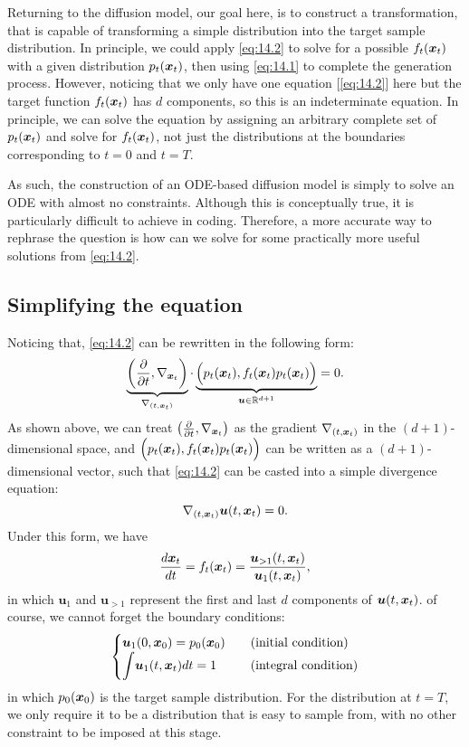Returning to the diffusion model, our goal here, is to construct a transformation, that is capable of transforming a simple distribution into the target sample distribution. In principle, we could apply \cref{eq:14.2} to solve for a possible $f_t(\bm{x}_{t})$ with a given distribution $p_t(\bm{x}_{t})$, then using \cref{eq:14.1} to complete the generation process. However, noticing that we only have one equation [\cref{eq:14.2}] here but the target function $f_t(\bm{x}_{t})$ has $d$ components, so this is an indeterminate equation. In principle, we can solve the equation by assigning an arbitrary complete set of $p_{t}(\bm{x}_t)$ and solve for $f_t(\bm{x}_{t})$, not just the distributions at the boundaries corresponding to $t=0$ and $t=T$.

As such, the construction of an ODE-based diffusion model is simply to solve an ODE with almost no constraints. Although this is conceptually true, it is particularly difficult to achieve in coding. Therefore, a more accurate way to rephrase the question is how can we solve for some practically more useful solutions from \cref{eq:14.2}.

\subsection{Simplifying the equation}

Noticing that, \cref{eq:14.2} can be rewritten in the following form:
\begin{equation}
    \label{eq:14.3}
    \underbrace{\left(\frac{\partial}{\partial t},\nabla_{\bm{x}_{t}}\right)}_{\nabla_{(t,\bm{x}_{t})}}\cdot \underbrace{\Bigl(p_t(\bm{x}_{t}),f_t(\bm{x}_{t})p_t(\bm{x}_{t}) \Bigr)}_{\bm{u}\in\mathbb{R}^{d+1}}=0.
\end{equation}
As shown above, we can treat $\left(\frac{\partial}{\partial t},\nabla_{\bm{x}_{t}}\right)$ as the gradient $\nabla_{(t,\bm{x}_{t})}$ in the $(d+1)$-dimensional space, and $\Bigl(p_t(\bm{x}_{t}),f_t(\bm{x}_{t})p_t(\bm{x}_{t}) \Bigr)$ can be written as a $(d+1)$-dimensional vector, such that \cref{eq:14.2} can be casted into a simple divergence equation:
\begin{equation}
    \label{eq:14.4}
    \nabla_{(t,\bm{x}_{t})}\bm{u}(t,\bm{x}_{t})=0.
\end{equation}
Under this form, we have 
\begin{equation}
    \label{eq:14.5}
    \frac{d\bm{x}_{t}}{dt}=f_t(\bm{x}_{t})=\frac{\bm{u}_{>1}(t,\bm{x}_{t})}{\bm{u}_1(t,\bm{x}_{t})},
\end{equation}
in which $\bm{u}_1$ and $\bm{u}_{>1}$ represent the first and last $d$ components of $\bm{u}(t,\bm{x}_{t})$. of course, we cannot forget the boundary conditions:
\begin{equation}
\label{eq:14.6}
    \begin{cases}
    \bm{u}_1(0,\bm{x}_0)=p_0(\bm{x}_0)  &\quad \mbox{(initial condition)} \\
    \displaystyle{\int}\bm{u}_1(t,\bm{x}_{t})dt=1 &\quad \mbox{(integral condition)} 
    \end{cases}
\end{equation}
in which $p_0(\bm{x}_0)$ is the target sample distribution. For the distribution at $t=T$, we only require it to be a distribution that is easy to sample from, with no other constraint to be imposed at this stage.

